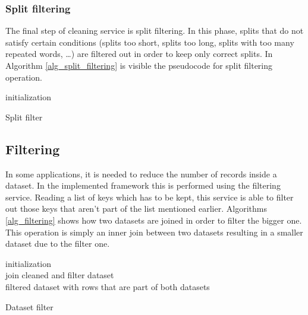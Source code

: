 \documentclass[\main/main.tex]{subfiles}
\begin{document}
\subsubsection{Split filtering}
The final step of cleaning service is split filtering. In this phase, splits that do not satisfy certain conditions (splits too short, splits too long, splits with too many repeated words, \dots) are filtered out in order to keep only correct splits. In Algorithm \ref{alg_split_filtering} is visible the pseudocode for split filtering operation. 
\begin{center}
    \begin{algorithm}[H]
     initialization \\
     \caption{Split filter}
     \label{alg_split_filtering}
    \end{algorithm}
\end{center}

\subsection{Filtering}
In some applications, it is needed to reduce the number of records inside a dataset. In the implemented framework this is performed using the filtering service. Reading a list of keys which has to be kept, this service is able to filter out those keys that aren't part of the list mentioned earlier. Algorithms \ref{alg_filtering} shows how two datasets are joined in order to filter the bigger one. This operation is simply an inner join between two datasets resulting in a smaller dataset due to the filter one.
\begin{center}
    \begin{algorithm}[H]
     initialization \\
     join cleaned and filter dataset \\
     \Return filtered dataset with rows that are part of both datasets
     \caption{Dataset filter}
     \label{alg_filtering}
    \end{algorithm}
\end{center}
\end{document}
